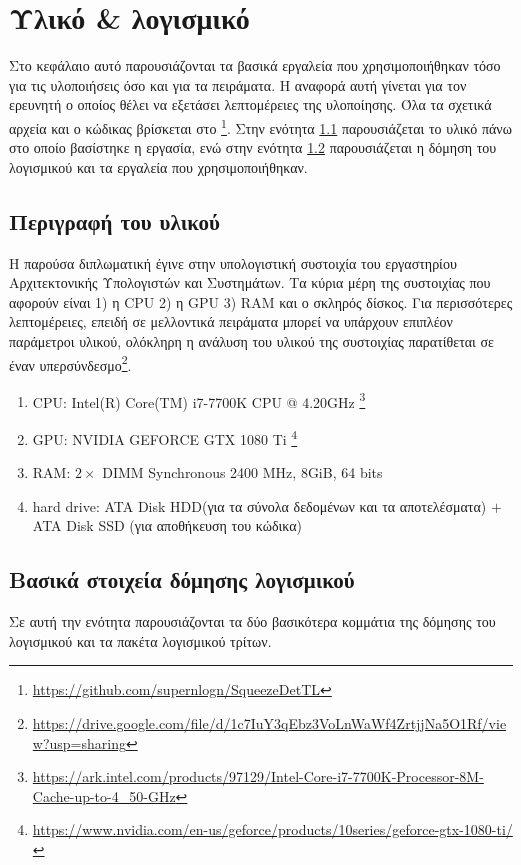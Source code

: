 \chapter{Υλικό \& λογισμικό}
\label{chapter:architecture}
Στο κεφάλαιο αυτό παρουσιάζονται τα βασικά εργαλεία που χρησιμοποιήθηκαν
τόσο για τις υλοποιήσεις όσο και για τα πειράματα. Η αναφορά αυτή γίνεται για τον ερευνητή ο οποίος θέλει να εξετάσει λεπτομέρειες της υλοποίησης. Όλα τα σχετικά αρχεία και ο κώδικας βρίσκεται στο \footnote{\url{https://github.com/supernlogn/SqueezeDetTL}}. Στην ενότητα \ref{section:hardware} παρουσιάζεται το υλικό πάνω στο οποίο βασίστηκε η εργασία, ενώ στην ενότητα \ref{section:software} παρουσιάζεται η δόμηση του λογισμικού και τα εργαλεία που χρησιμοποιήθηκαν.

\section{Περιγραφή του υλικού}
\label{section:hardware}
Η παρούσα διπλωματική έγινε στην υπολογιστική συστοιχία του εργαστηρίου Αρχιτεκτονικής Υπολογιστών και Συστημάτων. Τα κύρια μέρη της συστοιχίας που αφορούν είναι 1) η CPU 2) η GPU 3) RAM και ο σκληρός δίσκος. Για περισσότερες λεπτομέρειες, επειδή σε μελλοντικά πειράματα μπορεί να υπάρχουν επιπλέον παράμετροι υλικού, ολόκληρη η ανάλυση του υλικού της συστοιχίας παρατίθεται σε έναν υπερσύνδεσμο\footnote{\url{https://drive.google.com/file/d/1c7IuY3qEbz3VoLnWaWf4ZrtjjNa5O1Rf/view?usp=sharing}}.

\begin{enumerate}
    \item CPU: Intel(R) Core(TM) i7-7700K CPU @ 4.20GHz \footnote{\url{https://ark.intel.com/products/97129/Intel-Core-i7-7700K-Processor-8M-Cache-up-to-4_50-GHz}}
    \item GPU: NVIDIA GEFORCE GTX 1080 Ti \footnote{\url{https://www.nvidia.com/en-us/geforce/products/10series/geforce-gtx-1080-ti/}}
    \item RAM: $2 \times$ DIMM Synchronous 2400 MHz, 8GiB, 64 bits
    \item hard drive: ATA Disk HDD(για τα σύνολα δεδομένων και τα αποτελέσματα) $+$ ATA Disk SSD (για αποθήκευση του κώδικα) 
\end{enumerate}

\section{Βασικά στοιχεία δόμησης λογισμικού}
\label{section:software}
Σε αυτή την ενότητα παρουσιάζονται τα δύο βασικότερα κομμάτια της δόμησης του λογισμικού και τα πακέτα λογισμικού τρίτων.

